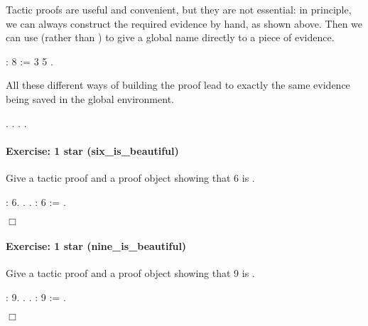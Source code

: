 \documentclass[12pt]{report}
\begin{document}
 Tactic proofs are useful and convenient, but they are not
    essential: in principle, we can always construct the required
    evidence by hand, as shown above. Then we can use  
    (rather than ) to give a global name directly to a 
    piece of evidence. \begin{coqdoccode}
\coqdocemptyline
\coqdocnoindent
{}  :  8 :=\coqdoceol
\coqdocindent{1.00em}
 3 5  .\coqdoceol
\coqdocemptyline
\end{coqdoccode}
All these different ways of building the proof lead to exactly the
    same evidence being saved in the global environment. \begin{coqdoccode}
\coqdocemptyline
\coqdocnoindent
{} .\coqdoceol
\coqdocnoindent
{} .\coqdoceol
\coqdocnoindent
{} .\coqdoceol
\coqdocnoindent
{} .\coqdoceol
\coqdocemptyline
\end{coqdoccode}
\paragraph{Exercise: 1 star (six\_is\_beautiful)}

 Give a tactic proof and a proof object showing that 6 is . \begin{coqdoccode}
\coqdocemptyline
\coqdocnoindent
{}  :\coqdoceol
\coqdocindent{1.00em}
 6.\coqdoceol
\coqdocnoindent
{}.\coqdoceol
 .\coqdoceol
\coqdocemptyline
\coqdocnoindent
{}  :  6 :=\coqdoceol
\coqdocindent{1.00em}
 .\coqdoceol
\end{coqdoccode}
\ensuremath{\Box} 

\paragraph{Exercise: 1 star (nine\_is\_beautiful)}

 Give a tactic proof and a proof object showing that 9 is . \begin{coqdoccode}
\coqdocemptyline
\coqdocnoindent
{}  :\coqdoceol
\coqdocindent{1.00em}
 9.\coqdoceol
\coqdocnoindent
{}.\coqdoceol
 .\coqdoceol
\coqdocemptyline
\coqdocnoindent
{}  :  9 :=\coqdoceol
\coqdocindent{1.00em}
 .\coqdoceol
\end{coqdoccode}
\ensuremath{\Box} \begin{coqdoccode}
\coqdocemptyline
\end{coqdoccode}
\end{document}
